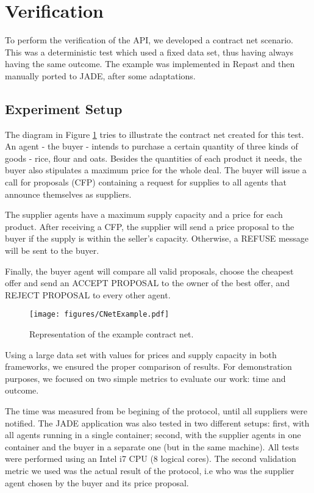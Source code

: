 \section{Verification}
\label{sec:verification}



To perform the verification of the API, we developed a contract net scenario. This was a deterministic test which used a fixed data set, thus having always having the same outcome. The example was implemented in Repast and then manually ported to JADE, after some adaptations.

\subsection{Experiment Setup}

The diagram in Figure \ref{fig:CNetExample} tries to illustrate the contract net created for this test. An agent - the buyer - intends to purchase a certain quantity of three kinds of goods - rice, flour and oats. Besides the quantities of each product it needs, the buyer also stipulates a maximum price for the whole deal. The buyer will issue a call for proposals (CFP) containing a request for supplies to all agents that announce themselves as suppliers.

The supplier agents have a maximum supply capacity and a price for each product. After receiving a CFP, the supplier will send a price proposal to the buyer if the supply is within the seller's capacity. Otherwise, a REFUSE message will be sent to the buyer.

Finally, the buyer agent will compare all valid proposals, choose the cheapest offer and send an ACCEPT PROPOSAL to the owner of the best offer, and REJECT PROPOSAL to every other agent.

\begin{figure}[h]
	\centering
	\texttt{[image: figures/CNetExample.pdf]}
	\caption{
		Representation of the example contract net.
	}
	\label{fig:CNetExample}
\end{figure}

Using a large data set with values for prices and supply capacity in both frameworks, we ensured the proper comparison of results. For demonstration purposes, we focused on two simple metrics to evaluate our work: time and  outcome.

The time was measured from be begining of the protocol, until all suppliers were notified. The JADE application was also tested in two different setups: first, with all agents running in a single container; second, with the supplier agents in one container and the buyer in a separate one (but in the same machine). All tests were performed using an Intel i7 CPU (8 logical cores). The second validation metric we used was the actual result of the protocol, i.e who was the supplier agent chosen by the buyer and its price proposal.

